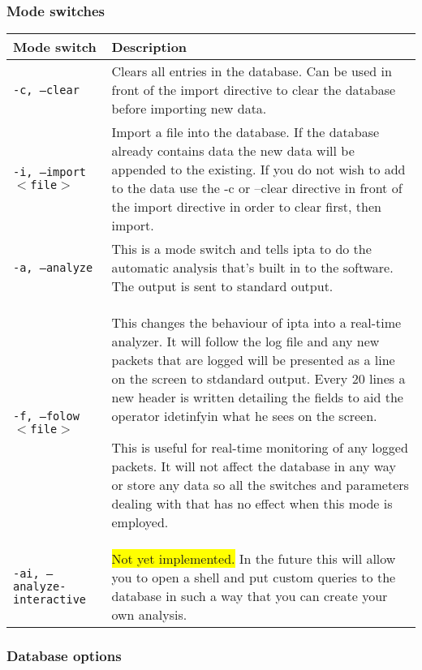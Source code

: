 \documentclass[english,twoside,openright,a4paper,12pt]{article}
\newcommand{\hilight}[1]{\colorbox{yellow}{#1}}
\begin{document}
\subsubsection{Mode switches}
\scriptsize
\begin{longtable}{|p{}|p{}|}
\hline
\textbf{Mode switch}& \textbf{Description}\\\hline

\texttt{-c, --clear} & 

Clears all entries in the database. Can be used in front of the import
directive to clear the database before importing new data.\\\hline

\texttt{-i, --import $<$file$>$} & 

Import a file into the database. If the database already contains data
the new data will be appended to the existing. If you do not wish to
add to the data use the -c or --clear directive in front of the import
directive in order to clear first, then import.\\\hline

\texttt{-a, --analyze} &  

This is a mode switch and tells ipta to do the automatic analysis
that's built in to the software. The output is sent to standard
output. \\\hline

\texttt{-f, --folow $<$file$>$} & 

This changes the behaviour of ipta into a real-time analyzer. It will
follow the log file and any new packets that are logged will be
presented as a line on the screen to stdandard output. Every 20 lines
a new header is written detailing the fields to aid the operator
idetinfyin what he sees on the screen.

This is useful for real-time monitoring of any logged packets. It will
not affect the database in any way or store any data so all the
switches and parameters dealing with that has no effect when this mode
is employed.\\\hline

\texttt{-ai, --analyze-interactive} & \hilight{Not yet implemented.}
In the future this will allow you to open a shell and put custom
queries to the database in such a way that you can create your own
analysis.\\\hline

\end{longtable}

\subsubsection{Database options}
\end{document}
